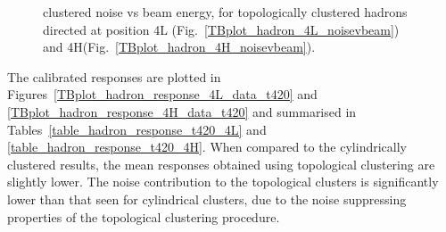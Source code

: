 \begin{figure}[htb]
\begin{center}
\caption{clustered noise vs beam energy, for topologically clustered hadrons directed at position 4L (Fig.~\ref{TBplot_hadron_4L_noisevbeam}) and 4H(Fig.~\ref{TBplot_hadron_4H_noisevbeam}).}
\end{center}
\end{figure}




The calibrated responses are plotted in Figures~\ref{TBplot_hadron_response_4L_data_t420} and \ref{TBplot_hadron_response_4H_data_t420} and summarised in Tables~\ref{table_hadron_response_t420_4L} and \ref{table_hadron_response_t420_4H}. When compared to the cylindrically clustered results, the mean responses obtained using topological clustering are slightly lower. The noise contribution to the topological clusters is significantly lower than that seen for cylindrical clusters, due to the noise suppressing properties of the topological clustering procedure.


